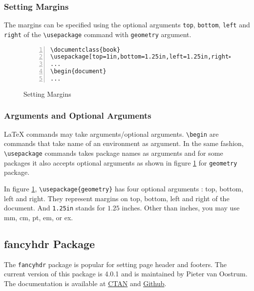\documentclass{article}
\begin{document}
\subsubsection{Setting Margins}
	The margins can be specified using the optional arguments \texttt{top}, \texttt{bottom}, \texttt{left} and \texttt{right} of the \texttt{\textbackslash usepackage} command with \texttt{geometry} argument.

\begin{figure}[h]
\centering
\begin{Verbatim}[numbers = left]
\documentclass{book}
\usepackage[top=1in,bottom=1.25in,left=1.25in,right=1.25in}{geometry}
...
\begin{document}
...
\end{Verbatim}
\caption{Setting Margins}
\label{fig:geometry}
\end{figure}

\subsubsection{Arguments and Optional Arguments}
	\LaTeX{} commands may take arguments/optional arguments. \texttt{\textbackslash begin} are commands that take name of an environment as argument. In the same fashion, \texttt{\textbackslash usepackage} commands takes package names as arguments and for some packages it also accepts optional arguments as shown in figure \ref{fig:geometry} for \texttt{geometry} package.

	In figure \ref{fig:geometry}, \texttt{\textbackslash usepackage\{geometry\}} has four optional arguments : top, bottom, left and right. They represent margins on top, bottom, left and right of the document. And \texttt{1.25in} stands for $1.25$ inches. Other than inches, you may use mm, cm, pt, em, or ex.

\subsection{fancyhdr Package}
	The \texttt{fancyhdr} package is popular for setting page header and footers. The current version of this package is 4.0.1 and is maintained by Pieter van Oostrum. The documentation is available at \href{https://ctan.org/pkg/fancyhdr}{CTAN} and \href{https://github.com/pietvo/fancyhdr}{Github}.
\end{document}
